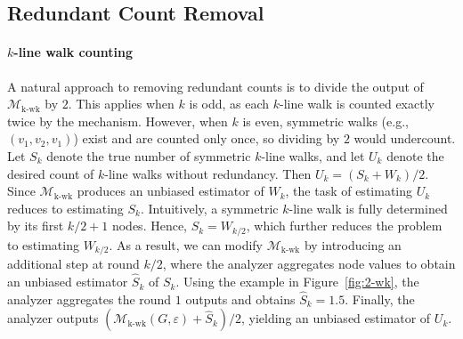 \subsection{Redundant Count Removal}
\label{app:redundant-orientation}






\paragraph{$k$-line walk counting}

A natural approach to removing redundant counts is to divide the output of $\mathcal{M}_{\mathrm{k\text{-}wk}}$ by $2$. 
This applies when $k$ is odd, as each $k$-line walk is counted exactly twice by the mechanism. 
However, when $k$ is even, symmetric walks (e.g., $(v_1, v_2, v_1)$) exist and are counted only once, so dividing by $2$ would undercount.
Let $S_k$ denote the true number of symmetric $k$-line walks, and let $U_k$ denote the desired count of $k$-line walks without redundancy.
Then $U_k = (S_k + W_k)/2$. 
Since $\mathcal{M}_{\mathrm{k\text{-}wk}}$ produces an unbiased estimator of $W_k$, the task of estimating $U_k$ reduces to estimating $S_k$.
Intuitively, a symmetric $k$-line walk is fully determined by its first $k/2 {+}1$ nodes. 
Hence, $S_k = W_{k/2}$, which further reduces the problem to estimating $W_{k/2}$. 
As a result, we can modify $\mathcal{M}_{\mathrm{k\text{-}wk}}$ by introducing an additional step at round $k/2$, where the analyzer aggregates node values to obtain an unbiased estimator $\hat{S}_k$ of $S_k$. 
Using the example in Figure~\ref{fig:2-wk}, the analyzer aggregates the round $1$ outputs and obtains $\widehat{S}_k = 1.5$.
Finally, the analyzer outputs $(\mathcal{M}_\mathrm{k\text{-}wk}(G, \varepsilon) + \hat{S}_k)/2$, yielding an unbiased estimator of $U_k$.




